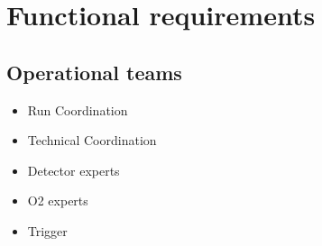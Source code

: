 \section{Functional requirements}

\subsection{Operational teams}
\begin{itemize}
  \item Run Coordination
  \item Technical Coordination
  \item Detector experts
  \item O2 experts
  \item Trigger
\end{itemize}

